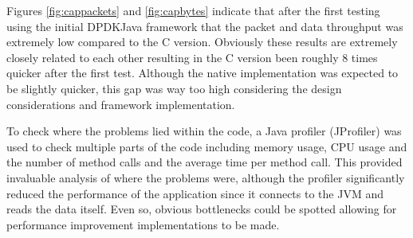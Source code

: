 \documentclass[final_report.tex]{subfiles}
\begin{document}
Figures \ref{fig:cappackets} and \ref{fig:capbytes} indicate that after the first testing using the initial DPDKJava framework that the packet and data throughput was extremely low compared to the C version. Obviously these results are extremely closely related to each other resulting in the C version been roughly 8 times quicker after the first test. Although the native implementation was expected to be slightly quicker, this gap was way too high considering the design considerations and framework implementation.

To check where the problems lied within the code, a Java profiler (JProfiler) was used to check multiple parts of the code including memory usage, CPU usage and the number of method calls and the average time per method call. This provided invaluable analysis of where the problems were, although the profiler significantly reduced the performance of the application since it connects to the JVM and reads the data itself. Even so, obvious bottlenecks could be spotted allowing for performance improvement implementations to be made.
\end{document}
